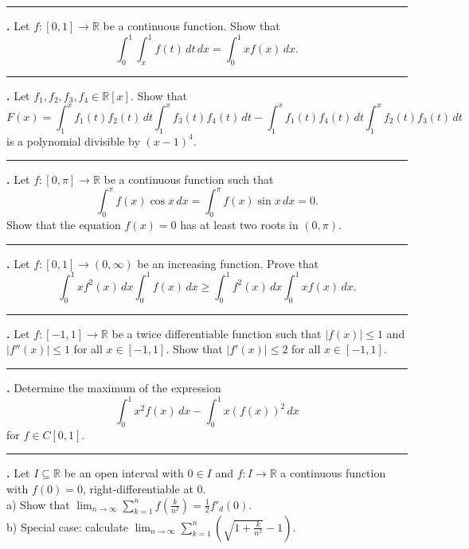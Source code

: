\documentclass[11pt]{article}
\newcounter{probnum}
\newenvironment{problembox}{\par\noindent\rule{\linewidth}{0.5pt}\vspace{5pt}\par}{\vspace{2pt}}
\begin{document}
\begin{problembox}
\textbf{\theprobnum.} Let $f : [0,1] \to \mathbb{R}$ be a continuous function. Show that
\[
\int_0^1 \int_x^1 f(t)\,dt\,dx = \int_0^1 x f(x)\,dx.
\]
\end{problembox}

\begin{problembox}
\textbf{\theprobnum.} Let $f_1, f_2, f_3, f_4 \in \mathbb{R}[x]$. Show that
\[
F(x) = \int_1^x f_1(t)f_2(t)\,dt \int_1^x f_3(t)f_4(t)\,dt - \int_1^x f_1(t)f_4(t)\,dt \int_1^x f_2(t)f_3(t)\,dt
\]
is a polynomial divisible by $(x-1)^4$.
\end{problembox}

\begin{problembox}
\textbf{\theprobnum.} Let $f : [0,\pi] \to \mathbb{R}$ be a continuous function such that
\[
\int_0^{\pi} f(x) \cos x\,dx = \int_0^{\pi} f(x) \sin x\,dx = 0.
\]
Show that the equation $f(x) = 0$ has at least two roots in $(0,\pi)$.
\end{problembox}

\begin{problembox}
\textbf{\theprobnum.} Let $f : [0,1] \to (0,\infty)$ be an increasing function. Prove that
\[
\int_0^1 x f^2(x)\,dx \int_0^1 f(x)\,dx \ge \int_0^1 f^2(x)\,dx \int_0^1 x f(x)\,dx.
\]
\end{problembox}

\begin{problembox}
\textbf{\theprobnum.} Let $f : [-1,1] \to \mathbb{R}$ be a twice differentiable function such that $|f(x)| \le 1$ and $|f''(x)| \le 1$ for all $x \in [-1,1]$. Show that $|f'(x)| \le 2$ for all $x \in [-1,1]$.
\end{problembox}

\begin{problembox}
\textbf{\theprobnum.} Determine the maximum of the expression
\[
\int_0^1 x^2 f(x)\,dx - \int_0^1 x (f(x))^2\,dx
\]
for $f \in C[0,1]$.
\end{problembox}

\begin{problembox}
\textbf{\theprobnum.} Let $I \subseteq \mathbb{R}$ be an open interval with $0 \in I$ and $f : I \to \mathbb{R}$ a continuous function with $f(0)=0$, right-differentiable at $0$.\\
a) Show that $\displaystyle\lim_{n \to \infty} \sum_{k=1}^{n} f\left(\frac{k}{n^2}\right) = \frac{1}{2} f'_d(0)$.\\
b) Special case: calculate $\displaystyle\lim_{n \to \infty} \sum_{k=1}^{n} \left(\sqrt{1+\frac{k}{n^2}} - 1\right)$.
\end{problembox}
\end{document}
